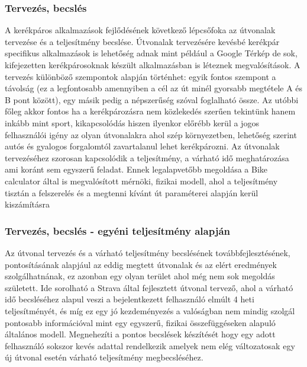 \subsubsection{Tervezés, becslés} 
A kerékpáros alkalmazások fejlődésének következő lépcsőfoka az útvonalak tervezése és a teljesítmény becslése. Útvonalak tervezésére kevésbé kerékpár specifikus alkalmazások is lehetőség adnak mint például a Google Térkép de sok, kifejezetten kerékpárosoknak készült alkalmazásban is léteznek megvalósítások. A tervezés különböző szempontok alapján történhet: egyik fontos szempont a távolság (ez a legfontosabb amennyiben a cél az út minél gyorsabb megtétele A és B pont között), egy másik pedig a népszerűség szóval foglalható össze. Az utóbbi főleg akkor fontos ha a kerékpározásra nem közlekedés szerűen tekintünk hanem inkább mint sport, kikapcsolódás hiszen ilyenkor előrébb kerül a jogos felhasználói igény az olyan útvonalakra ahol szép környezetben, lehetőség szerint autós és gyalogos forgalomtól zavartalanul lehet kerékpározni. Az útvonalak tervezéséhez szorosan kapcsolódik a teljesítmény, a várható idő meghatározása ami koránt sem egyszerű feladat. Ennek legalapvetőbb megoldása a Bike calculator által is megvalósított mérnöki, fizikai modell, ahol a teljesítmény tisztán a felszerelés és a megtenni kívánt út paraméterei alapján kerül kiszámításra


\subsubsection{Tervezés, becslés - egyéni teljesítmény alapján} 
Az útvonal tervezés és a várható teljesítmény becslésének továbbfejlesztésének, pontosításának alapjául az eddig megtett útvonalak és az elért eredmények szolgálhatnának, ez azonban egy olyan terület ahol még nem sok megoldás született. Ide sorolható a Strava által fejlesztett útvonal tervező, ahol a várható idő becsléséhez alapul veszi a bejelentkezett felhasználó elmúlt 4 heti teljesítményét, és míg ez egy jó kezdeményezés a valóságban nem mindig szolgál pontosabb információval mint egy egyszerű, fizikai összefüggéseken alapuló általános modell. Megnehezíti a pontos becslések készítését hogy egy adott felhasználó sokszor kevés adattal rendelkezik amelyek nem elég változatosak egy új útvonal esetén várható teljesítmény megbecsléséhez.\\[12pt]


